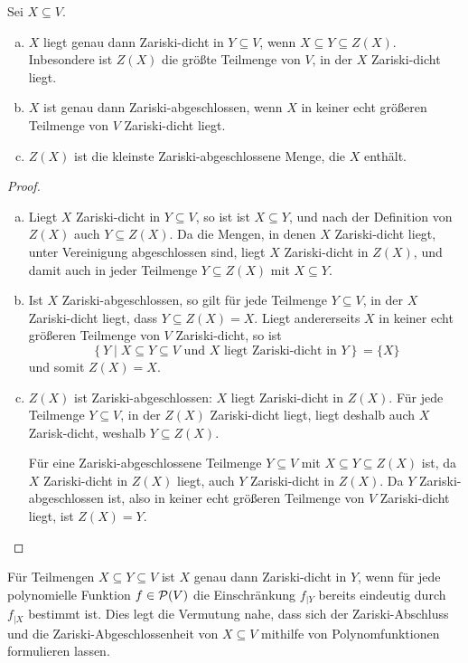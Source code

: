 \documentclass[a4paper,10pt]{article}
\begin{document}
\begin{lem}\label{lem: erste Aussagen über Zariski-Abschluss}
 Sei $X \subseteq V$.
 \begin{enumerate}[a)]
  \item
  $X$ liegt genau dann Zariski-dicht in $Y \subseteq V$, wenn $X \subseteq Y \subseteq Z(X)$. Inbesondere ist $Z(X)$ die größte Teilmenge von $V$, in der $X$ Zariski-dicht liegt.
  \item
  $X$ ist genau dann Zariski-abgeschlossen, wenn $X$ in keiner echt größeren Teilmenge von $V$ Zariski-dicht liegt.
  \item
  $Z(X)$ ist die kleinste Zariski-abgeschlossene Menge, die $X$ enthält. 
 \end{enumerate}
\end{lem}
\begin{proof}
 \begin{enumerate}[a)]
  \item
  Liegt $X$ Zariski-dicht in $Y \subseteq V$, so ist ist $X \subseteq Y$, und nach der Definition von $Z(X)$ auch $Y \subseteq Z(X)$. Da die Mengen, in denen $X$ Zariski-dicht liegt, unter Vereinigung abgeschlossen sind, liegt $X$ Zariski-dicht in $Z(X)$, und damit auch in jeder Teilmenge $Y \subseteq Z(X)$ mit $X \subseteq Y$.
  \item
  Ist $X$ Zariski-abgeschlossen, so gilt für jede Teilmenge $Y \subseteq V$, in der $X$ Zariski-dicht liegt, dass $Y \subseteq Z(X) = X$. Liegt andererseits $X$ in keiner echt größeren Teilmenge von $V$ Zariski-dicht, so ist
  \[
   \left\{ Y \mid X \subseteq Y \subseteq V \text{ und $X$ liegt Zariski-dicht in $Y$} \right\} = \{X\} 
  \]
  und somit $Z(X) = X$.
  \item
  $Z(X)$ ist Zariski-abgeschlossen: $X$ liegt Zariski-dicht in $Z(X)$. Für jede Teilmenge $Y \subseteq V$, in der $Z(X)$ Zariski-dicht liegt, liegt deshalb auch $X$ Zarisk-dicht, weshalb $Y \subseteq Z(X)$.
  
  Für eine Zariski-abgeschlossene Teilmenge $Y \subseteq V$ mit $X \subseteq Y \subseteq Z(X)$ ist, da $X$ Zariski-dicht in $Z(X)$ liegt, auch $Y$ Zariski-dicht in $Z(X)$. Da $Y$ Zariski-abgeschlossen ist, also in keiner echt größeren Teilmenge von $V$ Zariski-dicht liegt, ist $Z(X) = Y$. \qedhere
 \end{enumerate}
\end{proof}


Für Teilmengen $X \subseteq Y \subseteq V$ ist $X$ genau dann Zariski-dicht in $Y$, wenn für jede polynomielle Funktion $f \in \mathcal{P}(V)$ die Einschränkung $f_{|Y}$ bereits eindeutig durch $f_{|X}$ bestimmt ist. Dies legt die Vermutung nahe, dass sich der Zariski-Abschluss und die Zariski-Abgeschlossenheit von $X \subseteq V$ mithilfe von Polynomfunktionen formulieren lassen.
\end{document}
